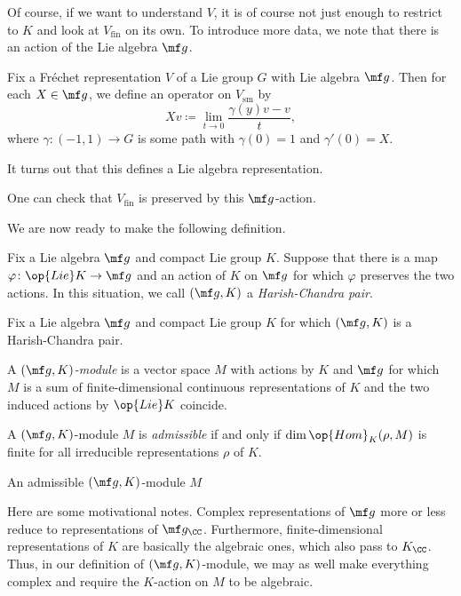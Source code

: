 \documentclass[../notes.tex]{subfiles}
\begin{document}
Of course, if we want to understand $V$, it is of course not just enough to restrict to $K$ and look at $V_{\mathrm{fin}}$ on its own. To introduce more data, we note that there is an action of the Lie algebra $\mf g$.
\begin{notation}
	Fix a Fr\'echet representation $V$ of a Lie group $G$ with Lie algebra $\mf g$. Then for each $X\in\mf g$, we define an operator on $V_{\mathrm{sm}}$ by
	\[Xv\coloneqq\lim_{t\to0}\frac{\gamma(y)v-v}t,\]
	where $\gamma\colon(-1,1)\to G$ is some path with $\gamma(0)=1$ and $\gamma'(0)=X$.
\end{notation}
\begin{remark}
	It turns out that this defines a Lie algebra representation.
\end{remark}
\begin{remark}
	One can check that $V_{\mathrm{fin}}$ is preserved by this $\mf g$-action.
\end{remark}
We are now ready to make the following definition.
\begin{definition}
	Fix a Lie algebra $\mf g$ and compact Lie group $K$. Suppose that there is a map $\varphi\colon\op{Lie}K\to\mf g$ and an action of $K$ on $\mf g$ for which $\varphi$ preserves the two actions. In this situation, we call $(\mf g,K)$ a \textit{Harish-Chandra pair}.
\end{definition}
\begin{defihelper}[$(\mf g,K)$-module] 
	Fix a Lie algebra $\mf g$ and compact Lie group $K$ for which $(\mf g,K)$ is a Harish-Chandra pair.
	\begin{listalph}
		\item A \textit{$(\mf g,K)$-module} is a vector space $M$ with actions by $K$ and $\mf g$ for which $M$ is a sum of finite-dimensional continuous representations of $K$ and the two induced actions by $\op{Lie}K$ coincide.
		\item A $(\mf g,K)$-module $M$ is \textit{admissible} if and only if $\dim\op{Hom}_K(\rho,M)$ is finite for all irreducible representations $\rho$ of $K$.
		\item An admissible $(\mf g,K)$-module $M$
	\end{listalph}
\end{defihelper}
\begin{remark}
	Here are some motivational notes. Complex representations of $\mf g$ more or less reduce to representations of $\mf g_\CC$. Furthermore, finite-dimensional representations of $K$ are basically the algebraic ones, which also pass to $K_\CC$. Thus, in our definition of $(\mf g,K)$-module, we may as well make everything complex and require the $K$-action on $M$ to be algebraic.
\end{remark}
\end{document}
